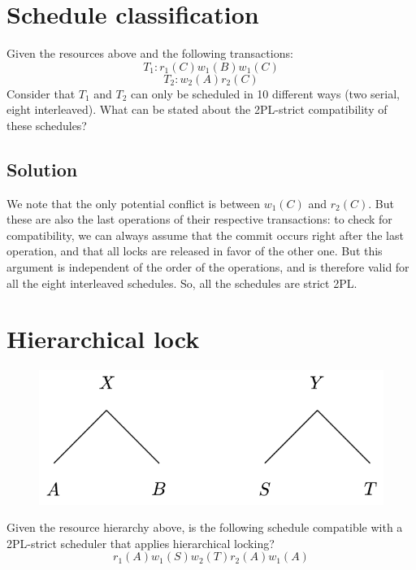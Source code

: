 \documentclass[12pt, a4paper]{report}
\newtheorem[style=M,bodystyle=\normalfont]{theorem}{Theorem}
\newtheorem[style=M,bodystyle=\normalfont]{corollary}{Corollary}
\newtheorem[style=M,bodystyle=\normalfont]{lemma}{Lemma}
\newtheorem[style=M,bodystyle=\normalfont]{definition}{Definition}
\begin{document}
    \section{Schedule classification}
        Given the resources above and the following transactions:
        \[T_1: r_1(C) w_1(B) w_1(C)\] 
        \[T_2: w_2(A) r_2(C)\]
        Consider that $T_1$ and $T_2$ can only be scheduled in 10 different ways (two serial, eight interleaved). What can be stated about 
        the 2PL-strict compatibility of these schedules? 
    \subsection*{Solution}
        We note that the only potential conflict is between $w_1(C)$ and $r_2(C)$. But these are also the last operations of their respective 
        transactions: to check for compatibility, we can always assume that the commit occurs right after the last operation, and that all 
        locks are released in favor of the other one. But this argument is independent of the order of the operations, and is therefore valid 
        for all the eight interleaved schedules. So, all the schedules are strict 2PL. 

    \newpage

    \section{Hierarchical lock}
        \begin{figure}[H]
            \centering
            \includegraphics[width=0.4\linewidth]{images/HL1.png}
        \end{figure}
        Given the resource hierarchy above, is the following schedule compatible with a 2PL-strict scheduler that applies hierarchical locking?
        \[r_1(A) w_1(S) w_2(T) r_2(A) w_1(A)\]
\end{document}
